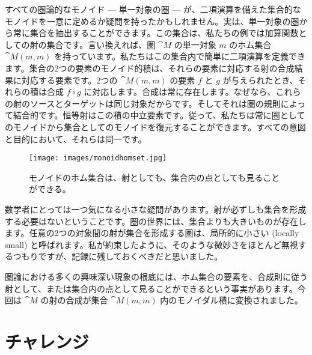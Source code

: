 すべての圏論的なモノイド --- 単一対象の圏 --- が、二項演算を備えた集合的なモノイドを一意に定めるか疑問を持ったかもしれません。実は、単一対象の圏から常に集合を抽出することができます。この集合は、私たちの例では加算関数としての射の集合です。言い換えれば、圏 \(\cat{M}\) の単一対象 \(m\) のホム集合 \(\cat{M}(m, m)\) を持っています。私たちはこの集合内で簡単に二項演算を定義できます。集合の2つの要素のモノイド的積は、それらの要素に対応する射の合成結果に対応する要素です。2つの \(\cat{M}(m, m)\) の要素 \(f\) と \(g\) が与えられたとき、それらの積は合成 \(f \circ g\) に対応します。合成は常に存在します。なぜなら、これらの射のソースとターゲットは同じ対象だからです。そしてそれは圏の規則によって結合的です。恒等射はこの積の中立要素です。従って、私たちは常に圏としてのモノイドから集合としてのモノイドを復元することができます。すべての意図と目的において、それらは同一です。

\begin{figure}[H]
  \centering
  \texttt{[image: images/monoidhomset.jpg]}
  \caption{モノイドのホム集合は、射としても、集合内の点としても見ることができる。}
\end{figure}

\noindent
数学者にとっては一つ気になる小さな疑問があります。射が必ずしも集合を形成する必要はないということです。圏の世界には、集合よりも大きいものが存在します。任意の2つの対象間の射が集合を形成する圏は、局所的に小さい (locally small) と呼ばれます。私が約束したように、そのような微妙さをほとんど無視するつもりですが、記録に残しておくべきだと思いました。

圏論における多くの興味深い現象の根底には、ホム集合の要素を、合成則に従う射として、または集合内の点として見ることができるという事実があります。今回は $\cat{M}$ の射の合成が集合 $\cat{M}(m, m)$ 内のモノイダル積に変換されました。

\section{チャレンジ}

